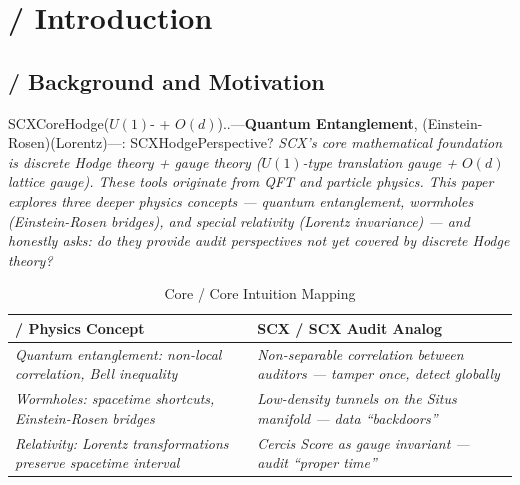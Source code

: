 \documentclass[11pt,a4paper]{article}
\theoremstyle{plain}
\theoremstyle{definition}
\theoremstyle{remark}
\begin{document}
{\begin{abstract}
\bigskip
\noindent
\textbf{Keywords:} SCX auditing, entanglement, wormholes, relativity, gauge invariance, information-theoretic security, persistent homology, manifold learning, group theory, audit formalization
\end{abstract}
\newpage
\tableofcontents
\newpage
\section{ / Introduction}
\label{sec:intro}
\subsection{ / Background and Motivation}
SCXCoreHodge($U(1)$- + $O(d)$)..---\textbf{Quantum Entanglement}, (Einstein-Rosen)(Lorentz)---: SCXHodgePerspective?
\textit{SCX's core mathematical foundation is discrete Hodge theory + gauge theory ($U(1)$-type translation gauge + $O(d)$ lattice gauge). These tools originate from QFT and particle physics. This paper explores three deeper physics concepts --- quantum entanglement, wormholes (Einstein-Rosen bridges), and special relativity (Lorentz invariance) --- and honestly asks: do they provide audit perspectives not yet covered by discrete Hodge theory?}
\begin{table}[h]
\centering
\begin{tabular}{p{4.5cm} p{7cm}}
\toprule
\textbf{ / Physics Concept} & \textbf{SCX / SCX Audit Analog} \\
\midrule
\textit{Quantum entanglement: non-local correlation, Bell inequality} & \textit{Non-separable correlation between auditors --- tamper once, detect globally} \\
\addlinespace
\textit{Wormholes: spacetime shortcuts, Einstein-Rosen bridges} & \textit{Low-density tunnels on the Situs manifold --- data ``backdoors''} \\
\addlinespace
\textit{Relativity: Lorentz transformations preserve spacetime interval} & \textit{Cercis Score as gauge invariant --- audit ``proper time''} \\
\bottomrule
\end{tabular}
\caption{Core / Core Intuition Mapping}
\label{tab:intuition}
\end{table}
}
\end{document}
